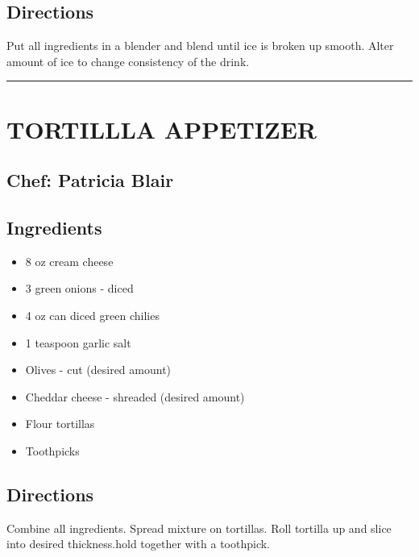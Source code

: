 \documentclass[
]{book}
\providecommand{\tightlist}{%
  \setlength{\itemsep}{0pt}\setlength{\parskip}{0pt}}
\begin{document}
\hypertarget{directions-9}{%
\subsection*{Directions}\label{directions-9}}


Put all ingredients in a blender and blend until ice is broken up smooth. Alter amount of ice to change consistency of the drink.

\begin{center}\rule{0.5\linewidth}{0.5pt}\end{center}

\hypertarget{tortillla-appetizer}{%
\section*{TORTILLLA APPETIZER}\label{tortillla-appetizer}}


\hypertarget{chef-patricia-blair-3}{%
\subsection*{Chef: Patricia Blair}\label{chef-patricia-blair-3}}


\hypertarget{ingredients-10}{%
\subsection*{Ingredients}\label{ingredients-10}}


\begin{itemize}
\tightlist
\item
  8 oz cream cheese
\item
  3 green onions - diced
\item
  4 oz can diced green chilies
\item
  1 teaspoon garlic salt
\item
  Olives - cut (desired amount)
\item
  Cheddar cheese - shreaded (desired amount)
\item
  Flour tortillas
\item
  Toothpicks
\end{itemize}

\hypertarget{directions-10}{%
\subsection*{Directions}\label{directions-10}}


Combine all ingredients. Spread mixture on tortillas. Roll tortilla up and slice into desired thickness.hold together with a toothpick.
\end{document}
